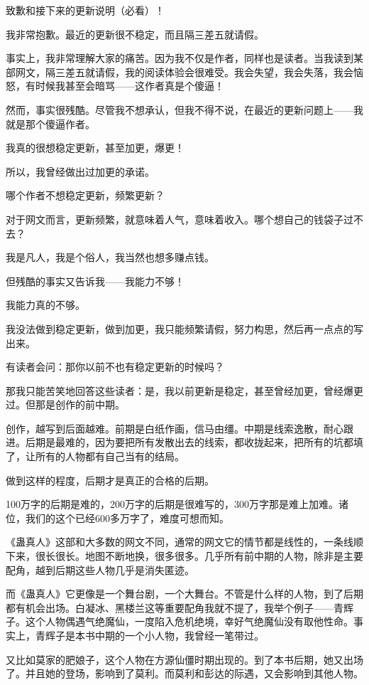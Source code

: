 \begin{this_body}
致歉和接下来的更新说明（必看）！

我非常抱歉。最近的更新很不稳定，而且隔三差五就请假。

事实上，我非常理解大家的痛苦。因为我不仅是作者，同样也是读者。当我读到某部网文，隔三差五就请假，我的阅读体验会很难受。我会失望，我会失落，我会恼怒，有时候我甚至会暗骂——这作者真是个傻逼！

然而，事实很残酷。尽管我不想承认，但我不得不说，在最近的更新问题上——我就是那个傻逼作者。

我真的很想稳定更新，甚至加更，爆更！

所以，我曾经做出过加更的承诺。

哪个作者不想稳定更新，频繁更新？

对于网文而言，更新频繁，就意味着人气，意味着收入。哪个想自己的钱袋子过不去？

我是凡人，我是个俗人，我当然也想多赚点钱。

但残酷的事实又告诉我——我能力不够！

我能力真的不够。

我没法做到稳定更新，做到加更，我只能频繁请假，努力构思，然后再一点点的写出来。

有读者会问：那你以前不也有稳定更新的时候吗？

那我只能苦笑地回答这些读者：是，我以前更新是稳定，甚至曾经加更，曾经爆更过。但那是创作的前中期。

创作，越写到后面越难。前期是白纸作画，信马由缰。中期是线索逸散，耐心跟进。后期是最难的，因为要把所有发散出去的线索，都收拢起来，把所有的坑都填了，让所有的人物都有自己当有的结局。

做到这样的程度，后期才是真正的合格的后期。

100万字的后期是难的，200万字的后期是很难写的，300万字那是难上加难。诸位，我们的这个已经600多万字了，难度可想而知。

《蛊真人》这部和大多数的网文不同，通常的网文它的情节都是线性的，一条线顺下来，很长很长。地图不断地换，很多很多。几乎所有前中期的人物，除非是主要配角，越到后期这些人物几乎是消失匿迹。

而《蛊真人》它更像是一个舞台剧，一个大舞台。不管是什么样的人物，到了后期都有机会出场。白凝冰、黑楼兰这等重要配角我就不提了，我举个例子——青辉子。这个人物偶遇气绝魔仙，一度陷入危机绝境，幸好气绝魔仙没有取他性命。事实上，青辉子是本书中期的一个小人物，我曾经一笔带过。

又比如莫家的肥娘子，这个人物在方源仙僵时期出现的。到了本书后期，她又出场了。并且她的登场，影响到了莫利。而莫利和彭达的际遇，又会影响到其他人物。


\end{this_body}

